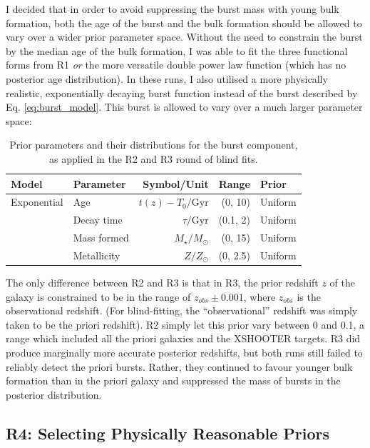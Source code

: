 \documentclass[a4paper,12pt]{article}
\begin{document}
I decided that in order to avoid suppressing the burst mass with young bulk
formation, both the age of the burst and the bulk formation should be allowed
to vary over a wider prior parameter space. Without the need to constrain the
burst by the median age of the bulk formation, I was able to fit the three
functional forms from R1 \textit{or} the more versatile double power law
function (which has no posterior age distribution). In these runs, I also
utilised a more physically realistic, exponentially decaying burst function
instead of the burst described by Eq. \ref{eq:burst_model}. This burst is
allowed to vary over a much larger parameter space:

\begin{table}[h!]
  \centering
  \begin{tabular}{l l r r l}
    Model       & Parameter   & Symbol/Unit              & Range    & Prior   \\
    \hline \hline
    Exponential & Age         & $t(z)-T_0/\mathrm{Gyr}$  & (0, 10)  & Uniform \\ %
                & Decay time  & $\tau/\mathrm{Gyr}$      & (0.1, 2) & Uniform \\
                & Mass formed & $M_\star/M_\odot$        & (0, 15)  & Uniform \\
                & Metallicity & $Z/Z_\odot$              & (0, 2.5) & Uniform \\
  \end{tabular}
  \caption{Prior parameters and their distributions for the burst component, as applied in the R2 and R3 round of blind fits.}
  \label{tab:r2_r3_burst_priors}
\end{table}

The only difference between R2 and R3 is that in R3, the prior redshift $z$ of
the galaxy is constrained to be in the range of $z_{obs}\pm 0.001$, where
$z_{obs}$ is the observational redshift. (For blind-fitting, the
``observational'' redshift was simply taken to be the priori redshift). R2
simply let this prior vary between 0 and 0.1, a range which included all the
priori galaxies and the XSHOOTER targets. R3 did produce marginally more
accurate posterior redshifts, but both runs still failed to reliably detect the
priori bursts. Rather, they continued to favour younger bulk formation than in
the priori galaxy and suppressed the mass of bursts in the posterior
distribution.

\subsection{R4: Selecting Physically Reasonable Priors}\label{sec:r4}
\end{document}
